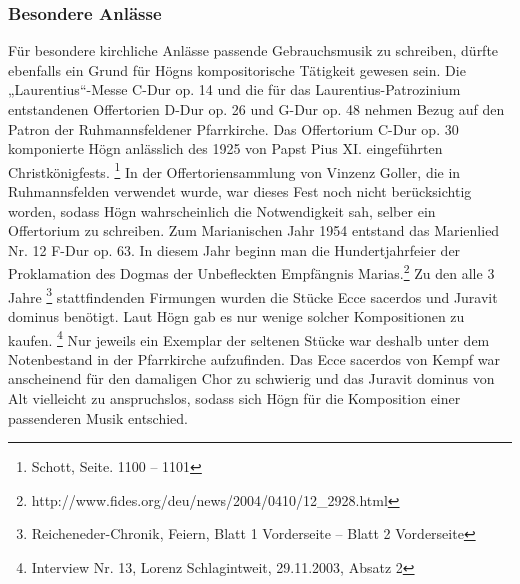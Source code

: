\documentclass[a4paper]{article}
\begin{document}
\subsubsection{Besondere Anlässe}
\hypertarget{RefHeadingToc100333747}{}Für besondere kirchliche Anlässe
passende Gebrauchsmusik zu schreiben, dürfte ebenfalls ein Grund für
Högns kompositorische Tätigkeit gewesen sein. Die „Laurentius“-Messe
C-Dur op. 14 und die für das Laurentius-Patrozinium entstandenen
Offertorien D-Dur op. 26 und G-Dur op. 48 nehmen Bezug auf den Patron
der Ruhmannsfeldener Pfarrkirche. Das Offertorium C-Dur op. 30
komponierte Högn anlässlich des 1925 von Papst Pius XI. eingeführten
Christkönigfests. \footnote{Schott, Seite. 1100 – 1101} In der
Offertoriensammlung von Vinzenz Goller, die in Ruhmannsfelden verwendet
wurde, war dieses Fest noch nicht berücksichtig worden, sodass Högn
wahrscheinlich die Notwendigkeit sah, selber ein Offertorium zu
schreiben. Zum Marianischen Jahr 1954 entstand das Marienlied Nr. 12
F-Dur op. 63. In diesem Jahr beginn man die Hundertjahrfeier der
Proklamation des Dogmas der Unbefleckten Empfängnis Marias.\footnote{
http://www.fides.org/deu/news/2004/0410/12\_2928.html} Zu den alle 3
Jahre \footnote{Reicheneder-Chronik, Feiern, Blatt 1 Vorderseite –
Blatt 2 Vorderseite} stattfindenden Firmungen wurden die Stücke Ecce
sacerdos und Juravit dominus benötigt. Laut Högn gab es nur wenige
solcher Kompositionen zu kaufen. \footnote{Interview Nr. 13, Lorenz
Schlagintweit, 29.11.2003, Absatz 2} Nur jeweils ein Exemplar der
seltenen Stücke war deshalb unter dem Notenbestand in der Pfarrkirche
aufzufinden. Das Ecce sacerdos von Kempf war anscheinend für den
damaligen Chor zu schwierig und das Juravit dominus von Alt vielleicht
zu anspruchslos, sodass sich Högn für die Komposition einer passenderen
Musik entschied.
\end{document}
